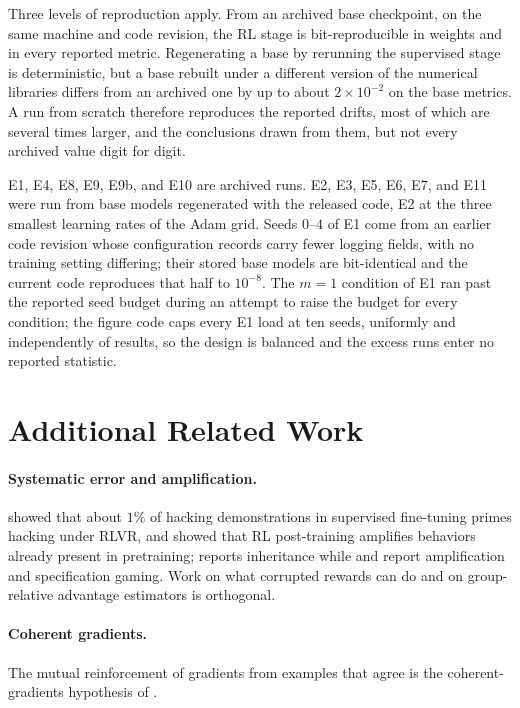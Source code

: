 Three levels of reproduction apply. From an archived base checkpoint, on the same machine and code revision, the RL stage is bit-reproducible in weights and in every reported metric. Regenerating a base by rerunning the supervised stage is deterministic, but a base rebuilt under a different version of the numerical libraries differs from an archived one by up to about $2\times10^{-2}$ on the base metrics. A run from scratch therefore reproduces the reported drifts, most of which are several times larger, and the conclusions drawn from them, but not every archived value digit for digit.

E1, E4, E8, E9, E9b, and E10 are archived runs. E2, E3, E5, E6, E7, and E11 were run from base models regenerated with the released code, E2 at the three smallest learning rates of the Adam grid. Seeds $0$--$4$ of E1 come from an earlier code revision whose configuration records carry fewer logging fields, with no training setting differing; their stored base models are bit-identical and the current code reproduces that half to $10^{-8}$. The $m=1$ condition of E1 ran past the reported seed budget during an attempt to raise the budget for every condition; the figure code caps every E1 load at ten seeds, uniformly and independently of results, so the design is balanced and the excess runs enter no reported statistic.

\section{Additional Related Work}
\label{app:related}

\paragraph{Systematic error and amplification.} \citet{khalifa2026countdown} showed that about $1\%$ of hacking demonstrations in supervised fine-tuning primes hacking under RLVR, and \citet{zhao2025echo} showed that RL post-training amplifies behaviors already present in pretraining; \citet{zhang2026leaky} reports inheritance while \citet{khalifa2026countdown} and \citet{nishimura2026specgaming} report amplification and specification gaming. Work on what corrupted rewards can do \citep{everitt2017corrupted, skalse2022defining, gao2023scaling} and on group-relative advantage estimators \citep{yang2026biased, zeng2025shrinkage} is orthogonal.

\paragraph{Coherent gradients.} The mutual reinforcement of gradients from examples that agree is the coherent-gradients hypothesis of \citet{chatterjee2020coherent}.

